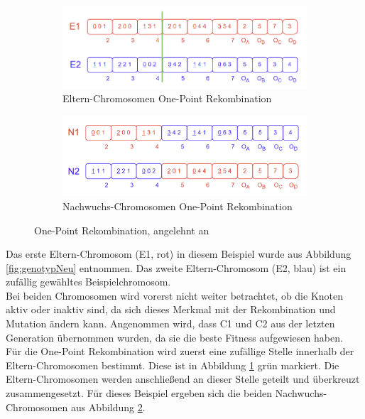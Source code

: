 \begin{figure}[H]
	\centering
	\begin{subfigure}[b]{\textwidth}
		\centering
		\includegraphics[scale = 0.77]{Bilder/BeispielOnePointCrossover.png}
		\caption{Eltern-Chromosomen One-Point Rekombination}
		\label{fig:onePointCrossoverEltern}
	\end{subfigure}
	
	\hfill
	
	\begin{subfigure}[b]{\textwidth}
		\centering
		\includegraphics[scale = 0.55]{Bilder/BeispielOnePointCrossover2.png}
		\caption{Nachwuchs-Chromosomen One-Point Rekombination}
		\label{fig:onePointCrossoverNachwuchs}
	\end{subfigure}
	\caption{One-Point Rekombination, angelehnt an \cite{torabi_using_2022}}
	\label{fig:onePointGesamt}
\end{figure}

Das erste Eltern-Chromosom (E1, rot) in diesem Beispiel wurde aus Abbildung \ref{fig:genotypNeu} entnommen.
Das zweite Eltern-Chromosom (E2, blau) ist ein zufällig gewähltes Beispielchromosom.\\
Bei beiden Chromosomen wird vorerst nicht weiter betrachtet, ob die Knoten aktiv oder inaktiv sind, da sich dieses Merkmal mit der Rekombination und Mutation ändern kann.
Angenommen wird, dass C1 und C2 aus der letzten Generation übernommen wurden, da sie die beste Fitness aufgewiesen haben.\\
Für die One-Point Rekombination wird zuerst eine zufällige Stelle innerhalb der Eltern-Chromosomen bestimmt.
Diese ist in Abbildung \ref{fig:onePointCrossoverEltern} grün markiert.
Die Eltern-Chromosomen werden anschließend an dieser Stelle geteilt und überkreuzt zusammengesetzt.
Für dieses Beispiel ergeben sich die beiden Nachwuchs-Chromosomen aus Abbildung \ref{fig:onePointCrossoverNachwuchs}.


